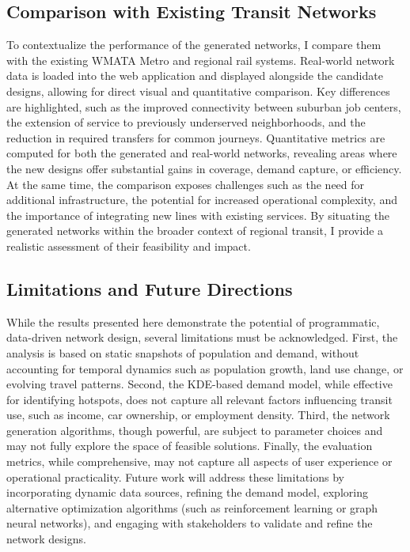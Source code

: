 \documentclass[manuscript]{acmart}
\begin{document}
\subsection{Comparison with Existing Transit Networks}
To contextualize the performance of the generated networks, I compare them with the existing WMATA Metro and regional rail systems. Real-world network data is loaded into the web application and displayed alongside the candidate designs, allowing for direct visual and quantitative comparison. Key differences are highlighted, such as the improved connectivity between suburban job centers, the extension of service to previously underserved neighborhoods, and the reduction in required transfers for common journeys. Quantitative metrics are computed for both the generated and real-world networks, revealing areas where the new designs offer substantial gains in coverage, demand capture, or efficiency. At the same time, the comparison exposes challenges such as the need for additional infrastructure, the potential for increased operational complexity, and the importance of integrating new lines with existing services. By situating the generated networks within the broader context of regional transit, I provide a realistic assessment of their feasibility and impact.

\subsection{Limitations and Future Directions}
While the results presented here demonstrate the potential of programmatic, data-driven network design, several limitations must be acknowledged. First, the analysis is based on static snapshots of population and demand, without accounting for temporal dynamics such as population growth, land use change, or evolving travel patterns. Second, the KDE-based demand model, while effective for identifying hotspots, does not capture all relevant factors influencing transit use, such as income, car ownership, or employment density. Third, the network generation algorithms, though powerful, are subject to parameter choices and may not fully explore the space of feasible solutions. Finally, the evaluation metrics, while comprehensive, may not capture all aspects of user experience or operational practicality. Future work will address these limitations by incorporating dynamic data sources, refining the demand model, exploring alternative optimization algorithms (such as reinforcement learning or graph neural networks), and engaging with stakeholders to validate and refine the network designs.
\end{document}
